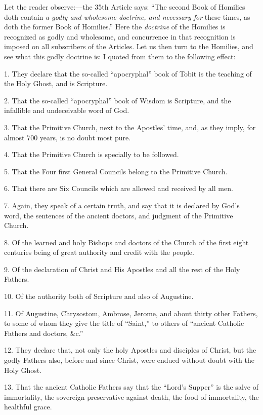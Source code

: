 Let the reader observe:—the 35th Article says: ``The second
Book of Homilies doth contain \emph{a godly and wholesome doctrine, and
necessary for} these times, as doth the former Book of
Homilies.'' Here the \emph{doctrine} of the Homilies is recognized
as godly and wholesome, and concurrence in that recognition is imposed on all subscribers of the Articles. Let us then turn to the
Homilies, and see what this godly doctrine is: I quoted from them to the
following effect:

1. They declare that the so-called ``apocryphal'' book of
Tobit is the teaching of the Holy Ghost, and is Scripture.

2. That the so-called ``apocryphal'' book of Wisdom is
Scripture, and the infallible and undeceivable word of God.

3. That the Primitive Church, next to the Apostles' time, and, as
they imply, for almost 700 years, is no doubt most pure.

4. That the Primitive Church is specially to be followed.

5. That the Four first General Councils belong to the Primitive
Church.

6. That there are Six Councils which are allowed and received by all
men.

7. Again, they speak of a certain truth, and say that it is declared by God's word, the sentences of the ancient doctors, and
judgment of the Primitive Church.

8. Of the learned and holy Bishops and doctors of the Church
of the first eight centuries being of great authority and
credit with the people.

9. Of the declaration of Christ and His Apostles and all the rest of
the Holy Fathers.

10. Of the authority both of Scripture and also of
Augustine.

11. Of Augustine, Chrysostom, Ambrose, Jerome, and about thirty other
Fathers, to some of whom they give the title of ``Saint,'' to
others of ``ancient Catholic Fathers and doctors,
\&c.''

12. They declare that, not only the holy Apostles and disciples of
Christ, but the godly Fathers also, before and since Christ, were endued
without doubt with the Holy Ghost.

13. That the ancient Catholic Fathers say that the ``Lord's
Supper'' is the salve of immortality, the sovereign preservative
against death, the food of immortality, the healthful grace.

